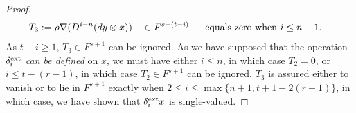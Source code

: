 \documentclass[11pt]{amsart} \renewcommand{\baselinestretch}{1.2}
\theoremstyle{plain}
\numberwithin{equation}{section} %
\theoremstyle{plain}
\numberwithin{equation}{chapter} %
\newcommand{\twist}{\omega}
\newcommand{\Nabla}{\nabla}
\begin{document}
\begin{second quadrant homotopy sseq operations}
\begin{proof}
\begin{alignat*}{3}
T_3:={}&\rho\Nabla(D^{i-n}(dy\otimes x))&&\in F^{s+(t-i)}&&\textup{\ \ equals zero when }i\leq n-1.
\end{alignat*}
As $t-i\geq1$, $T_3\in F^{s+1}$ can be ignored. As we have supposed that the operation $\delta^\textup{ext}_i$ \emph{can be defined} on $x$, we must have either $i\leq n$, in which case $T_2=0$, or $i\leq t-(r-1)$, in which case $T_2\in F^{s+1}$ can be ignored. $T_3$ is assured either to vanish or to lie in $F^{s+1}$ exactly when $2\leq i\leq \max\{n+1,t+1-2(r-1)\}$, in which case, we have shown that $\delta^\textup{ext}_ix$ is single-valued.



\end{proof}
\end{second quadrant homotopy sseq operations}
\end{document}
